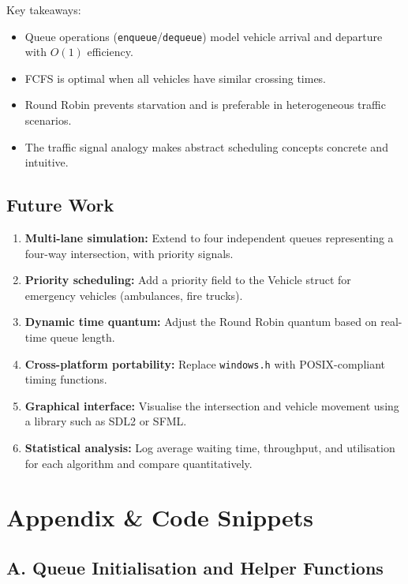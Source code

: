 \documentclass[12pt,a4paper]{article}
\begin{document}
Key takeaways:
\begin{itemize}
    \item Queue operations (\texttt{enqueue}/\texttt{dequeue}) model vehicle arrival and departure with $O(1)$ efficiency.
    \item FCFS is optimal when all vehicles have similar crossing times.
    \item Round Robin prevents starvation and is preferable in heterogeneous traffic scenarios.
    \item The traffic signal analogy makes abstract scheduling concepts concrete and intuitive.
\end{itemize}

\subsection{Future Work}
\begin{enumerate}
    \item \textbf{Multi-lane simulation:} Extend to four independent queues representing a four-way intersection, with priority signals.
    \item \textbf{Priority scheduling:} Add a priority field to the Vehicle struct for emergency vehicles (ambulances, fire trucks).
    \item \textbf{Dynamic time quantum:} Adjust the Round Robin quantum based on real-time queue length.
    \item \textbf{Cross-platform portability:} Replace \texttt{windows.h} with POSIX-compliant timing functions.
    \item \textbf{Graphical interface:} Visualise the intersection and vehicle movement using a library such as SDL2 or SFML.
    \item \textbf{Statistical analysis:} Log average waiting time, throughput, and utilisation for each algorithm and compare quantitatively.
\end{enumerate}

\newpage

\section{Appendix \& Code Snippets}

\subsection{A. Queue Initialisation and Helper Functions}
\end{document}
